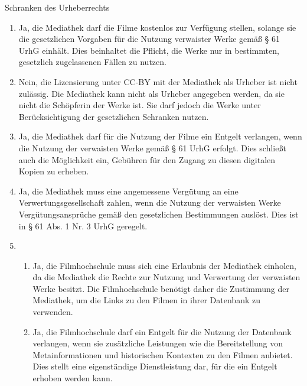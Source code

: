 \documentclass{article}
\begin{document}
\begin{exercise}{Schranken des Urheberrechts}
  \begin{solution}
    \begin{enumerate}
      \item Ja, die Mediathek darf die Filme kostenlos zur Verfügung stellen, solange sie die gesetzlichen Vorgaben für die Nutzung verwaister Werke gemäß § 61 UrhG einhält. Dies beinhaltet die Pflicht, die Werke nur in bestimmten, gesetzlich zugelassenen Fällen zu nutzen.
      \item Nein, die Lizensierung unter CC-BY mit der Mediathek als Urheber ist nicht zulässig. Die Mediathek kann nicht als Urheber angegeben werden, da sie nicht die Schöpferin der Werke ist. Sie darf jedoch die Werke unter Berücksichtigung der gesetzlichen Schranken nutzen.
      \item Ja, die Mediathek darf für die Nutzung der Filme ein Entgelt verlangen, wenn die Nutzung der verwaisten Werke gemäß § 61 UrhG erfolgt. Dies schließt auch die Möglichkeit ein, Gebühren für den Zugang zu diesen digitalen Kopien zu erheben.
      \item Ja, die Mediathek muss eine angemessene Vergütung an eine Verwertungsgesellschaft zahlen, wenn die Nutzung der verwaisten Werke Vergütungsansprüche gemäß den gesetzlichen Bestimmungen auslöst. Dies ist in § 61 Abs. 1 Nr. 3 UrhG geregelt.
      \item
            \begin{enumerate}
              \item Ja, die Filmhochschule muss sich eine Erlaubnis der Mediathek einholen, da die Mediathek die Rechte zur Nutzung und Verwertung der verwaisten Werke besitzt. Die Filmhochschule benötigt daher die Zustimmung der Mediathek, um die Links zu den Filmen in ihrer Datenbank zu verwenden.
              \item Ja, die Filmhochschule darf ein Entgelt für die Nutzung der Datenbank verlangen, wenn sie zusätzliche Leistungen wie die Bereitstellung von Metainformationen und historischen Kontexten zu den Filmen anbietet. Dies stellt eine eigenständige Dienstleistung dar, für die ein Entgelt erhoben werden kann.
            \end{enumerate}
    \end{enumerate}
  \end{solution}
\end{exercise}
\end{document}
